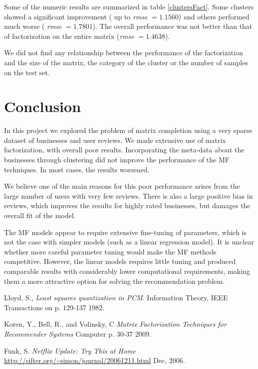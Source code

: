 \documentclass[12pt]{article}
\begin{document}
Some of the numeric results are summarized in table \ref{clustersFact}. Some clusters showed a significant improvement ( up to \emph{rmse} $= 1.1560$) and others performed much worse ( \emph{rmse} $= 1.7801$). The overall performance was not better than that of factorization on the entire matrix (\emph{rmse} $= 1.4638 $).

We did not find any relationship between the performance of the factorization and the size of the matrix, the category of the cluster or the number of samples on the test set. 

\section{Conclusion}\label{conclusion}

In this project we explored the problem of matrix completion using a very sparse dataset of businesses and user reviews. We made extensive use of matrix factorization, with overall poor results. Incorporating the meta-data about the businesses through clustering did not improve the performance of the MF techniques. In most cases, the results worsened.

We believe one of the main reasons for this poor performance arises from the large number of users with very few reviews. There is also a large positive bias in reviews, which improves the results for highly rated businesses, but damages the overall fit of the model. 

The MF models appear to require extensive fine-tuning of parameters, which is not the case with simpler models (such as a linear regression model). It is unclear whether more careful parameter tuning would make the MF methods competitive. However, the linear models requires little tuning and produced comparable results with considerably lower computational requirements, making them a more attractive option for solving the recommendation problem.

\begin{thebibliography}{9}

  Lloyd, S.,
  \emph{Least squares quantization in PCM}.
  Information Theory, IEEE Transactions on
  p. 129-137
  1982.

  Koren, Y., Bell, R., and Volinsky, C
  \emph{Matrix Factorization Techniques for Recommender Systems}
  Computer
  p. 30-37
  2009.

  Funk, S.
  \emph{Netflix Update: Try This at Home}
  \url{http://sifter.org/~simon/journal/20061211.html}
  Dec, 2006.

\end{thebibliography}
\end{document}
